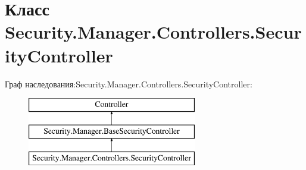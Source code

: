 \hypertarget{class_security_1_1_manager_1_1_controllers_1_1_security_controller}{}\section{Класс Security.\+Manager.\+Controllers.\+Security\+Controller}
\label{class_security_1_1_manager_1_1_controllers_1_1_security_controller}
Граф наследования\+:Security.\+Manager.\+Controllers.\+Security\+Controller\+:\begin{figure}[H]
\begin{center}
\leavevmode
\includegraphics[height=3.000000cm]{d3/d35/class_security_1_1_manager_1_1_controllers_1_1_security_controller}
\end{center}
\end{figure}
